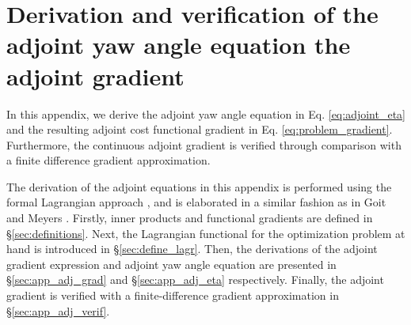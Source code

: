 \documentclass[energies,article,submit,moreauthors,latex,10pt,a4paper]{mdpi}
\begin{document}
\vspace{6pt} 





\appendix
\section{Derivation and verification of the adjoint yaw angle equation the adjoint gradient}\label{sec:app_adj_der}

\noindent In this appendix, we derive the adjoint yaw angle equation in Eq. \ref{eq:adjoint_eta} and the resulting adjoint cost functional gradient in Eq. \ref{eq:problem_gradient}. Furthermore, the continuous adjoint gradient is verified through comparison with a finite difference gradient approximation. 

The derivation of the adjoint equations in this appendix is performed using the formal Lagrangian approach \cite{troltzsch, borzinschulz}, and is elaborated in a similar fashion as in Goit and Meyers \cite{goit2015optimal}. Firstly, inner products and functional gradients are defined in \S\ref{sec:definitions}. Next, the Lagrangian functional for the optimization problem at hand is introduced in \S\ref{sec:define_lagr}. Then, the derivations of the adjoint gradient expression and adjoint yaw angle equation are presented in \S\ref{sec:app_adj_grad} and \S\ref{sec:app_adj_eta} respectively. Finally, the adjoint gradient is verified with a finite-difference gradient approximation in \S\ref{sec:app_adj_verif}. 
\end{document}
